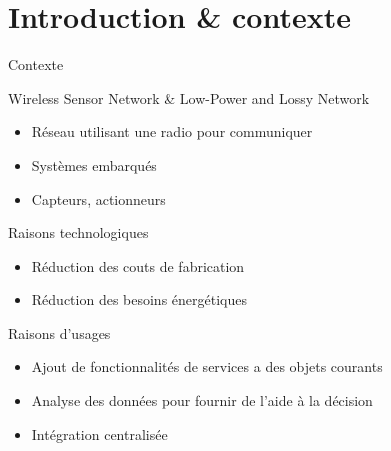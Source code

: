 \section{Introduction \& contexte}

\begin{frame}{Contexte}
  \begin{block}{Wireless Sensor Network \& Low-Power and Lossy Network}
    \begin{itemize}
      \item Réseau utilisant une radio pour communiquer
      \item Systèmes embarqués
      \item Capteurs, actionneurs
    \end{itemize}
  \end{block}

  \begin{block}{Raisons technologiques}
    \begin{itemize}
      \item Réduction des couts de fabrication
      \item Réduction des besoins énergétiques
    \end{itemize}
  \end{block}

  \begin{block}{Raisons d'usages}
    \begin{itemize}
      \item Ajout de fonctionnalités de services a des objets courants
      \item Analyse des données pour fournir de l'aide à la décision
      \item Intégration centralisée
    \end{itemize}
  \end{block}


\end{frame}

